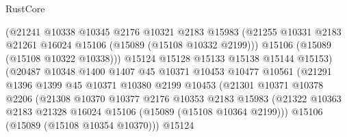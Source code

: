 \begin{lexlean}{RustCore}
\begin{coremodule}
                                (@21241
                                  @10338
                                  @10345
                                  @2176
                                  @10321
                                  @2183
                                  @15983
                                  (@21255
                                    @10331
                                    @2183
                                    @21261
                                    @16024
                                    @15106
                                    (@15089 (@15108 @10332 @2199)))
                                  @15106
                                  (@15089 (@15108 @10322 @10338)))
                                @15124
                                @15128
                                @15133
                                @15138
                                @15144
                                @15153)
                              (@20487
                                @10348
                                @1400
                                @1407
                                @45
                                @10371
                                @10453
                                @10477
                                @10561
                                (@21291
                                  @1396
                                  @1399
                                  @45
                                  @10371
                                  @10380
                                  @2199
                                  @10453
                                  (@21301
                                    @10371
                                    @10378
                                    @2206
                                    (@21308
                                      @10370
                                      @10377
                                      @2176
                                      @10353
                                      @2183
                                      @15983
                                      (@21322
                                        @10363
                                        @2183
                                        @21328
                                        @16024
                                        @15106
                                        (@15089 (@15108 @10364 @2199)))
                                      @15106
                                      (@15089 (@15108 @10354 @10370)))
                                    @15124

\end{coremodule}
\end{lexlean}

